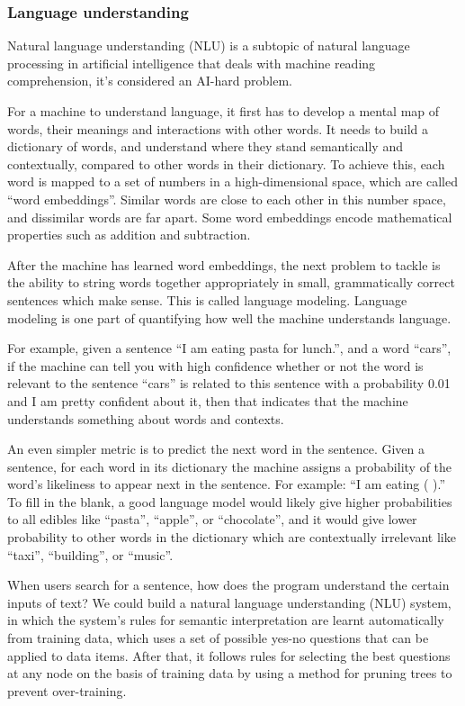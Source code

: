 \subsubsection*{Language understanding}

Natural language understanding (NLU) is a subtopic of natural language processing in artificial intelligence that deals with machine reading comprehension, it's considered an AI-hard problem.

For a machine to understand language, it first has to develop a mental map of words, their meanings and interactions with other words. It needs to build a dictionary of words, and understand where they stand semantically and contextually, compared to other words in their dictionary. To achieve this, each word is mapped to a set of numbers in a high-dimensional space, which are called “word embeddings”. Similar words are close to each other in this number space, and dissimilar words are far apart. Some word embeddings encode mathematical properties such as addition and subtraction.

After the machine has learned word embeddings, the next problem to tackle is the ability to string words together appropriately in small, grammatically correct sentences which make sense. This is called language modeling. Language modeling is one part of quantifying how well the machine understands language.

For example, given a sentence “I am eating pasta for lunch.”, and a word “cars”, if the machine can tell you with high confidence whether or not the word is relevant to the sentence “cars” is related to this sentence with a probability 0.01 and I am pretty confident about it, then that indicates that the machine understands something about words and contexts.

An even simpler metric is to predict the next word in the sentence. Given a sentence, for each word in its dictionary the machine assigns a probability of the word’s likeliness to appear next in the sentence. For example: “I am eating (     ).” To fill in the blank, a good language model would likely give higher probabilities to all edibles like “pasta”, “apple”, or “chocolate”, and it would give lower probability to other words in the dictionary which are contextually irrelevant like “taxi”, “building”, or “music”.

When users search for a sentence, how does the program understand the certain inputs of text? We could build a natural language understanding (NLU) system, in which the system's rules for semantic interpretation are learnt automatically from training data, which uses a set of possible yes-no questions that can be applied to data items.
After that, it follows rules for selecting the best questions at any node on the basis of training data by using a method for pruning trees to prevent over-training.

